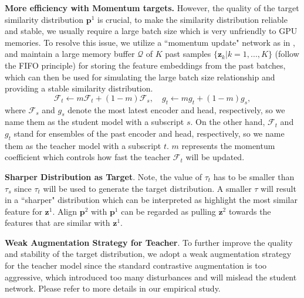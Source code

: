 \documentclass{article}
\newcommand{\<}{\left\langle}
\renewcommand{\>}{\right\rangle}
\begin{document}
\textbf{More efficiency with Momentum targets.} 
However, the quality of the target similarity distribution $\mathbf{p}^1$ is crucial, to make the similarity distribution reliable and stable, we usually require a large batch size which is very unfriendly to GPU memories. To resolve this issue, we utilize a ``momentum update" network as in \cite{moco, mocov2}, and maintain a large memory buffer $\mathcal{Q}$ of $K$ past samples $\{\mathbf{z}_k | k = 1, ... , K \}$ (follow the FIFO principle) for storing the feature embeddings from the past batches, which can then be used for simulating the large batch size relationship and providing a stable similarity distribution. 
\begin{equation} \label{equation:ema}
    \mathcal{F}_t \leftarrow m \mathcal{F}_t + (1 - m)\mathcal{F}_s, \quad  g_t \leftarrow m g_t + (1 - m) g_s,
\end{equation}
where $\mathcal{F}_s$ and $g_s$ denote the most latest encoder and head, respectively, so we name them as the student model with a subscript $s$. On the other hand, $\mathcal{F}_t$ and $g_t$ stand for ensembles of the past encoder and head, respectively, so we name them as the teacher model with a subscript $t$. $m$ represents the momentum coefficient which controls how fast the teacher $\mathcal{F}_t$ will be updated.


























\textbf{Sharper Distribution as Target}.
 Note, the value of $\tau_t$ has to be smaller than $\tau_s$ since $\tau_t$ will be used to generate the target distribution. A smaller $\tau$ will result in a ``sharper" distribution which can be interpreted as highlight the most similar feature for $\mathbf{z}^1$. Align $\mathbf{p}^2$ with $\mathbf{p}^1$ can be regarded as pulling $\mathbf{z}^2$ towards the features that are similar with $\mathbf{z}^1$.

\textbf{Weak Augmentation Strategy for Teacher}.
To further improve the quality and stability of the target distribution, we adopt a weak augmentation strategy for the teacher model since the standard contrastive augmentation is too aggressive, which introduced too many disturbances and will mislead the student network. Please refer to more details in our empirical study. 
\end{document}
